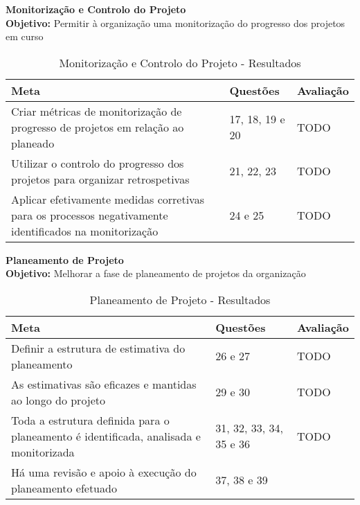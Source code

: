 \documentclass[openany,10pt,a4paper]{article}
\begin{document}
\textbf{Monitorização e Controlo do Projeto}  \\
\textbf{Objetivo:} Permitir à organização uma monitorização do progresso dos projetos em curso
    
\begin{table}[]
    \centering
    \caption{Monitorização e Controlo do Projeto - Resultados}
    \begin{tabular}{p{2in}|p{2in}|p{2in}}
         \hline	
		\textbf{Meta} & \textbf{Questões} & \textbf{Avaliação} \\ \hline
		Criar métricas de monitorização de progresso de projetos em relação ao planeado & 17, 18, 19 e 20 & TODO \\ \hline
		Utilizar o controlo do progresso dos projetos para organizar retrospetivas & 21, 22, 23 & TODO \\ \hline
		Aplicar efetivamente medidas corretivas para os processos negativamente identificados na monitorização & 24 e 25 & TODO \\ \hline
    \end{tabular}
    \label{tab:analise-monitorizacao}
\end{table}

\textbf{Planeamento de Projeto}  \\
\textbf{Objetivo:} Melhorar a fase de planeamento de projetos da organização

\begin{table}[]
    \centering
    \caption{Planeamento de Projeto - Resultados}
    \begin{tabular}{p{3in}|p{2in}|p{1in}}
        \hline	
		\textbf{Meta} & \textbf{Questões} & \textbf{Avaliação} \\ \hline
		Definir a estrutura de estimativa do planeamento & 26 e 27 & TODO \\ \hline
		As estimativas são eficazes e mantidas ao longo do projeto & 29 e 30 & TODO \\ \hline
		Toda a estrutura definida para o planeamento é identificada, analisada e monitorizada & 31, 32, 33, 34, 35 e 36 & TODO \\ \hline
		Há uma revisão e apoio à execução do planeamento efetuado & 37, 38 e 39
	\end{tabular}
    \label{tab:analise-planeamento}
\end{table}
\end{document}
